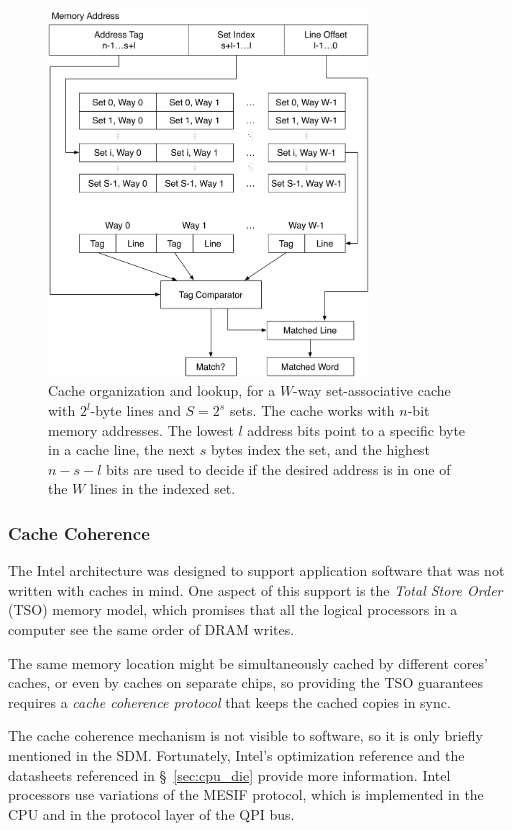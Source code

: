\begin{figure}[hbt]
  \centering
  \includegraphics[width=85mm]{figures/cpu_cache.pdf}
  \caption{
    Cache organization and lookup, for a $W$-way set-associative cache with
    $2^{l}$-byte lines and $S = 2^{s}$ sets. The cache works with $n$-bit
    memory addresses. The lowest $l$ address bits point to a specific byte in a
    cache line, the next $s$ bytes index the set, and the highest $n - s - l$
    bits are used to decide if the desired address is in one of the $W$ lines
    in the indexed set.
  }
  \label{fig:cpu_cache}
\end{figure}


\subsubsection{Cache Coherence}
\label{sec:cache_coherence}

The Intel architecture was designed to support application software that was
not written with caches in mind. One aspect of this support is the
\textit{Total Store Order} (TSO) \cite{owens2009tso} memory model, which
promises that all the logical processors in a computer see the same order of
DRAM writes.

The same memory location might be simultaneously cached by different cores'
caches, or even by caches on separate chips, so providing the TSO guarantees
requires a \textit{cache coherence protocol} that keeps the cached copies in
sync.

The cache coherence mechanism is not visible to software, so it is only briefly
mentioned in the SDM. Fortunately, Intel's optimization reference
\cite{intel2014optimization} and the datasheets referenced in
\S~\ref{sec:cpu_die} provide more information. Intel processors use variations
of the MESIF \cite{goodman2009mesif} protocol, which is implemented in the CPU
and in the protocol layer of the QPI bus.

